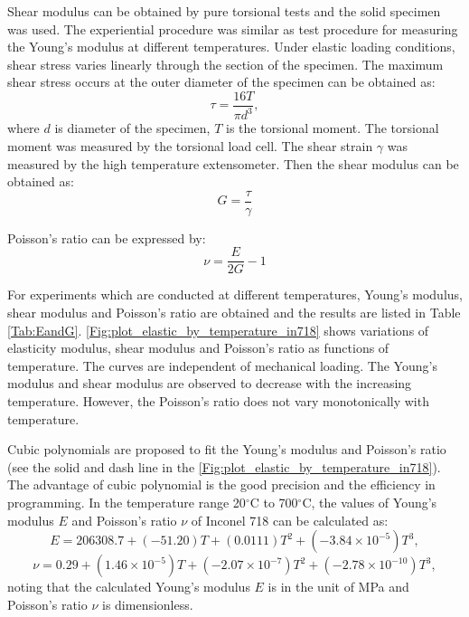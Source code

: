 Shear modulus can be obtained by pure torsional tests and the solid specimen was used.
The experiential procedure was similar as test procedure for measuring the Young's modulus at different temperatures.
Under elastic loading conditions, shear stress varies linearly through the section of the specimen.
The maximum shear stress occurs at the outer diameter of the specimen can be obtained as:
\begin{equation}
\tau=\frac{{16T}}{\pi d^3},
\end{equation}
where $d$ is diameter of the specimen, $T$ is the torsional moment.
The torsional moment was measured by the torsional load cell.
The shear strain $\gamma$ was measured by the high temperature extensometer.
Then the shear modulus can be obtained as:
\begin{equation}
G=\frac{\tau}{\gamma}
\end{equation}

Poisson's ratio can be expressed by:
\begin{equation}
\nu  = \frac{E}{{2G}} - 1
\end{equation}

For experiments which are conducted at different temperatures, Young's modulus, shear modulus and Poisson's ratio are obtained and the results are listed in Table \ref{Tab:EandG}.
\ref{Fig:plot_elastic_by_temperature_in718} shows variations of elasticity modulus, shear modulus and Poisson's ratio as functions of temperature. The curves are independent of mechanical loading. The Young's modulus and shear modulus are observed to decrease with the increasing temperature. However, the Poisson's ratio does not vary monotonically with temperature.

Cubic polynomials are proposed to fit the Young's modulus and Poisson's ratio (see the solid and dash line in the \ref{Fig:plot_elastic_by_temperature_in718}).
The advantage of cubic polynomial is the good precision and the efficiency in programming.
In the temperature range 20$^{\circ}$C to 700$^{\circ}$C, the values of Young's modulus $E$ and Poisson's ratio $\nu$ of Inconel 718 can be calculated as:
\begin{equation}
E=206308.7+(-51.20)T+(0.0111)T^2+(-3.84\times10^{-5})T^3,
\end{equation}
\begin{equation}
\nu=0.29+(1.46\times10^{-5})T+(-2.07\times10^{-7})T^2+(-2.78\times10^{-10})T^3,
\end{equation}
noting that the calculated Young's modulus $E$ is in the unit of MPa and Poisson's ratio $\nu$ is dimensionless.

